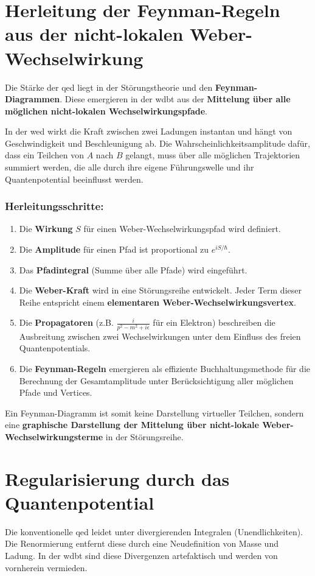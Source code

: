 \section{Herleitung der Feynman-Regeln aus der nicht-lokalen Weber-Wechselwirkung}
Die Stärke der \gls{qed} liegt in der Störungstheorie und den \textbf{Feynman-Diagrammen}. Diese emergieren in der \gls{wdbt} aus der \textbf{Mittelung über alle möglichen nicht-lokalen Wechselwirkungspfade}.

In der \gls{wed} wirkt die Kraft zwischen zwei Ladungen instantan und hängt von Geschwindigkeit und Beschleunigung ab. Die Wahrscheinlichkeitsamplitude dafür, dass ein Teilchen von $A$ nach $B$ gelangt,
muss über alle möglichen Trajektorien summiert werden, die alle durch ihre eigene Führungswelle und ihr Quantenpotential beeinflusst werden.

\subsubsection{Herleitungsschritte:}
\begin{enumerate}
    \item Die \textbf{Wirkung} $S$ für einen Weber-Wechselwirkungspfad wird definiert.
    \item Die \textbf{Amplitude} für einen Pfad ist proportional zu $e^{iS/\hbar}$.
    \item Das \textbf{Pfadintegral} (Summe über alle Pfade) wird eingeführt.
    \item Die \textbf{Weber-Kraft} wird in eine Störungsreihe entwickelt. Jeder Term dieser Reihe entspricht einem \textbf{elementaren Weber-Wechselwirkungsvertex}.
    \item Die \textbf{Propagatoren} (z.B. $\frac{i}{p^2 - m^2 + i\epsilon}$ für ein Elektron) beschreiben die Ausbreitung zwischen zwei Wechselwirkungen unter dem Einfluss des freien Quantenpotentials.
    \item Die \textbf{Feynman-Regeln} emergieren als effiziente Buchhaltungsmethode für die Berechnung der Gesamtamplitude unter Berücksichtigung aller möglichen Pfade und Vertices.
\end{enumerate}

Ein Feynman-Diagramm ist somit keine Darstellung virtueller Teilchen, sondern eine \textbf{graphische Darstellung der Mittelung über nicht-lokale Weber-Wechselwirkungsterme} in der Störungsreihe.

\section{Regularisierung durch das Quantenpotential}
Die konventionelle \gls{qed} leidet unter divergierenden Integralen (Unendlichkeiten). Die Renormierung entfernt diese durch eine Neudefinition von Masse und Ladung. In der \gls{wdbt} sind diese
Divergenzen artefaktisch und werden von vornherein vermieden.

